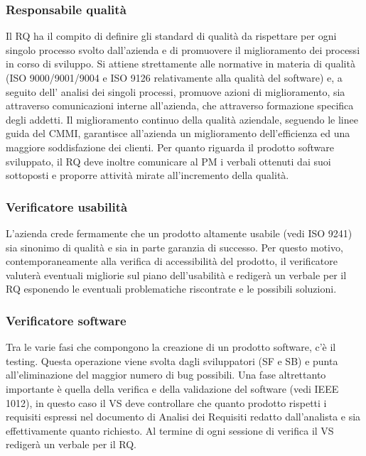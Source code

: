 \subsubsection{Responsabile qualit\`{a}}
Il RQ ha il compito di definire gli standard di qualit\`{a} da rispettare per ogni singolo processo
svolto dall\textquoteright{}azienda e di promuovere il miglioramento dei processi in corso di sviluppo.
Si attiene strettamente alle normative in materia di qualit\`{a} (ISO 9000/9001/9004
e ISO 9126 relativamente alla qualit\`{a} del software) e, a seguito dell\textquoteright{} analisi dei singoli
processi, promuove azioni di miglioramento, sia attraverso comunicazioni interne all\textquoteright{}azienda,
che attraverso formazione specifica degli addetti. Il miglioramento continuo
della qualit\`{a} aziendale, seguendo le linee guida del CMMI, garantisce all\textquoteright{}azienda un
miglioramento dell\textquoteright{}efficienza ed una maggiore soddisfazione dei clienti. Per quanto riguarda
il prodotto software sviluppato, il RQ deve inoltre comunicare al PM i verbali
ottenuti dai suoi sottoposti e proporre attivit\`{a} mirate all\textquoteright{}incremento della qualit\`{a}.

\subsubsection{Verificatore usabilit\`{a}}
L\textquoteright{}azienda crede fermamente che un prodotto altamente usabile (vedi ISO 9241) sia
sinonimo di qualit\`{a} e sia in parte garanzia di successo. Per questo motivo, contemporaneamente
alla verifica di accessibilit\`{a} del prodotto, il verificatore valuter\`{a} eventuali
migliorie sul piano dell\textquoteright{}usabilit\`{a} e rediger\`{a} un verbale per il RQ esponendo le eventuali problematiche riscontrate e le possibili soluzioni.

\subsubsection{Verificatore software}
Tra le varie fasi che compongono la creazione di un prodotto software, c\textquoteright{}\`{e} il testing.
Questa operazione viene svolta dagli sviluppatori (SF e SB) e punta all\textquoteright{}eliminazione del
maggior numero di bug possibili. Una fase altrettanto importante \`{e} quella della verifica
e della validazione del software (vedi IEEE 1012), in questo caso il VS deve controllare
che quanto prodotto rispetti i requisiti espressi nel documento di Analisi dei Requisiti
redatto dall\textquoteright{}analista e sia effettivamente quanto richiesto. Al termine di ogni sessione di verifica il VS rediger\`{a} un verbale per il RQ.

